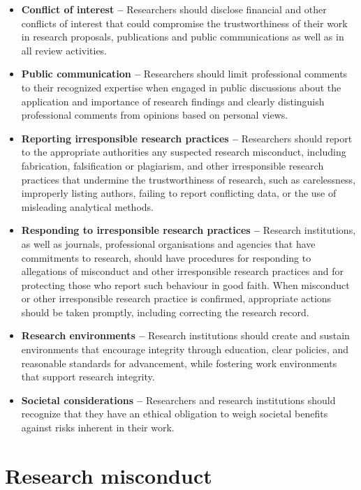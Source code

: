 \documentclass[
]{book}
\begin{document}
\begin{itemize}
\item
  \textbf{Conflict of interest --} Researchers should disclose financial and other conflicts of interest that could compromise the trustworthiness of their work in research proposals, publications and public communications as well as in all review activities.
\item
  \textbf{Public communication --} Researchers should limit professional comments to their recognized expertise when engaged in public discussions about the application and importance of research findings and clearly distinguish professional comments from opinions based on personal views.
\item
  \textbf{Reporting irresponsible research practices --} Researchers should report to the appropriate authorities any suspected research misconduct, including fabrication, falsification or plagiarism, and other irresponsible research practices that undermine the trustworthiness of research, such as carelessness, improperly listing authors, failing to report conflicting data, or the use of misleading analytical methods.
\item
  \textbf{Responding to irresponsible research practices --} Research institutions, as well as journals, professional organisations and agencies that have commitments to research, should have procedures for responding to allegations of misconduct and other irresponsible research practices and for protecting those who report such behaviour in good faith. When misconduct or other irresponsible research practice is confirmed, appropriate actions should be taken promptly, including correcting the research record.
\item
  \textbf{Research environments --} Research institutions should create and sustain environments that encourage integrity through education, clear policies, and reasonable standards for advancement, while fostering work environments that support research integrity.
\item
  \textbf{Societal considerations --} Researchers and research institutions should recognize that they have an ethical obligation to weigh societal benefits against risks inherent in their work.
\end{itemize}

\hypertarget{research-misconduct}{%
\section{Research misconduct}\label{research-misconduct}}
\end{document}

